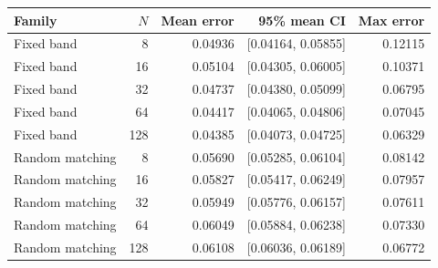 \begin{tabular}{lrrrr}\toprule Family & $N$ & Mean error & 95\% mean CI & Max error\\\midrule
Fixed band & 8 & 0.04936 & [0.04164, 0.05855] & 0.12115\\
Fixed band & 16 & 0.05104 & [0.04305, 0.06005] & 0.10371\\
Fixed band & 32 & 0.04737 & [0.04380, 0.05099] & 0.06795\\
Fixed band & 64 & 0.04417 & [0.04065, 0.04806] & 0.07045\\
Fixed band & 128 & 0.04385 & [0.04073, 0.04725] & 0.06329\\
Random matching & 8 & 0.05690 & [0.05285, 0.06104] & 0.08142\\
Random matching & 16 & 0.05827 & [0.05417, 0.06249] & 0.07957\\
Random matching & 32 & 0.05949 & [0.05776, 0.06157] & 0.07611\\
Random matching & 64 & 0.06049 & [0.05884, 0.06238] & 0.07330\\
Random matching & 128 & 0.06108 & [0.06036, 0.06189] & 0.06772\\
\bottomrule\end{tabular}
